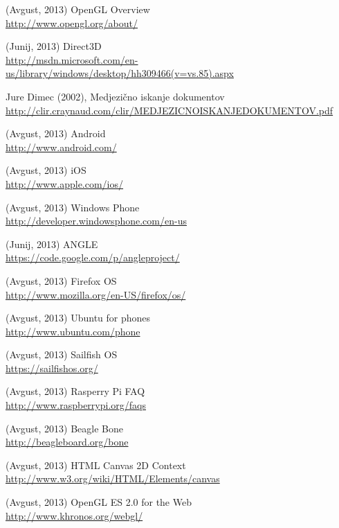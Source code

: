 \begin{thebibliography}{1}


 (Avgust, 2013) OpenGL Overview
\\ \url{http://www.opengl.org/about/}

 (Junij, 2013) Direct3D
\\ \url{http://msdn.microsoft.com/en-us/library/windows/desktop/hh309466(v=vs.85).aspx}

 Jure Dimec (2002), Medjezično iskanje dokumentov 
\\ \url{http://clir.craynaud.com/clir/MEDJEZICNOISKANJEDOKUMENTOV.pdf}

 (Avgust, 2013) Android
\\ \url{http://www.android.com/}

 (Avgust, 2013) iOS
\\ \url{http://www.apple.com/ios/}

 (Avgust, 2013) Windows Phone
\\ \url{http://developer.windowsphone.com/en-us}

 (Junij, 2013) ANGLE
\\ \url{https://code.google.com/p/angleproject/}

 (Avgust, 2013) Firefox OS
\\ \url{http://www.mozilla.org/en-US/firefox/os/}

 (Avgust, 2013) Ubuntu for phones
\\ \url{http://www.ubuntu.com/phone}

 (Avgust, 2013) Sailfish OS
\\ \url{https://sailfishos.org/}

 (Avgust, 2013) Rasperry Pi FAQ
\\ \url{http://www.raspberrypi.org/faqs}

 (Avgust, 2013) Beagle Bone
\\ \url{http://beagleboard.org/bone}

 (Avgust, 2013) HTML Canvas 2D Context
\\ \url{http://www.w3.org/wiki/HTML/Elements/canvas}

 (Avgust, 2013) OpenGL ES 2.0 for the Web 
\\ \url{http://www.khronos.org/webgl/}


\end{thebibliography}
